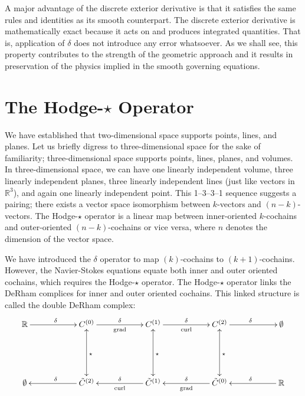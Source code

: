 A major advantage of the discrete exterior derivative is that it satisfies the same rules and identities as its smooth counterpart. The discrete exterior derivative is mathematically exact because it acts on and produces integrated quantities. That is, application of $\delta$ does not introduce any error whatsoever. As we shall see, this property contributes to the strength of the geometric approach and it results in preservation of the physics implied in the smooth governing equations.

\section{The Hodge-$\star$ Operator}

We have established that two-dimensional space supports points, lines, and planes. Let us briefly digress to three-dimensional space for the sake of familiarity; three-dimensional space supports points, lines, planes, and volumes. In three-dimensional space, we can have one linearly independent volume, three linearly independent planes, three linearly independent lines (just like vectors in $\mathbb{R}^3$), and again one linearly independent point. This 1--3--3--1 sequence suggests a pairing; there exists a vector space isomorphism between $k$-vectors and $(n-k)$-vectors. The Hodge-$\star$ operator is a linear map between inner-oriented $k$-cochains and outer-oriented $(n-k)$-cochains or vice versa, where $n$ denotes the dimension of the vector space.

We have introduced the $\delta$ operator to map $(k)$-cochains to $(k+1)$-cochains. However, the Navier-Stokes equations equate both inner and outer oriented cochains, which requires the Hodge-$\star$ operator. The Hodge-$\star$ operator links the DeRham complices for inner and outer oriented cochains. This linked structure is called the double DeRham complex:
\begin{equation}
    \begin{gathered}
        \xymatrix@=13ex{
            \mathbb{R} \ar[r]^{\delta} & C^{(0)} \ar[r]^{\delta}_{\text{grad}} \ar@{<->}[d]^{\star} & C^{(1)} \ar[r]^{\delta}_{\text{curl}} \ar@{<->}[d]^{\star} & C^{(2)} \ar@{<->}[d]^{\star} \ar[r]^{\delta} & \emptyset \\
            \emptyset & \tilde{C}^{(2)} \ar[l]_{\delta} & \tilde{C}^{(1)} \ar[l]_{\delta}^{\text{curl}} & \tilde{C}^{(0)} \ar[l]_{\delta}^{\text{grad}} & \mathbb{R} \ar[l]_{\delta}
        }
    \end{gathered}
    \label{eq:doubleDeRham}
\end{equation}

